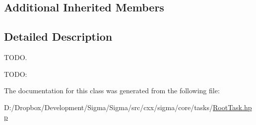 \subsection*{Additional Inherited Members}


\subsection{Detailed Description}
T\+O\+D\+O. 

T\+O\+D\+O\+: 

The documentation for this class was generated from the following file\+:\begin{DoxyCompactItemize}
\item 
D\+:/\+Dropbox/\+Development/\+Sigma/\+Sigma/src/cxx/sigma/core/tasks/\hyperlink{_root_task_8hpp}{Root\+Task.\+hpp}\end{DoxyCompactItemize}
